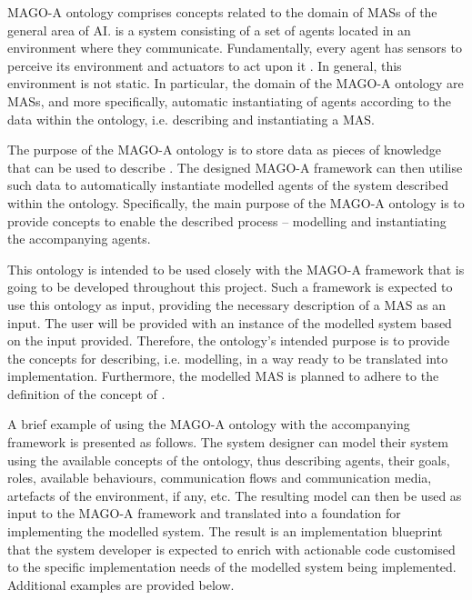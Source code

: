 MAGO-A ontology
%
comprises concepts related to the domain of \acp{MAS} of the general area of \ac{AI}.  is a system consisting of a set of agents located in an environment where they communicate. Fundamentally, every agent has sensors to perceive its environment and actuators to act upon it \cite[p. 54]{russell2022ArtificialIntelligenceModern}. In general, this environment is not static. In particular, the domain of the MAGO-A ontology are \acp{MAS}, and more specifically, automatic instantiating of agents according to the data within the ontology, i.e. describing and instantiating a \ac{MAS}.

The purpose
%
of the MAGO-A ontology is to store data as pieces of knowledge that can be used to describe . The designed MAGO-A framework can then utilise such data to automatically instantiate modelled agents of the system described within the ontology. Specifically, the main purpose of the MAGO-A ontology is to provide concepts to enable the described process -- modelling  and instantiating the accompanying agents.

This ontology is intended to be used
%
closely with the MAGO-A framework that is going to be developed throughout this project. Such a framework is expected to use this ontology as input, providing the necessary description of a \ac{MAS} as an input. The user will be provided with an instance of the modelled system based on the input provided. Therefore, the ontology's intended purpose is to provide the concepts for describing, i.e. modelling,  in a way ready to be translated into implementation. Furthermore, the modelled \ac{MAS} is planned to adhere to the definition of the concept of .

A brief example of using
%
the MAGO-A ontology with the accompanying framework is presented as follows. The system designer can model their system using the available concepts of the ontology, thus describing agents, their goals, roles, available behaviours, communication flows and communication media, artefacts of the environment, if any, etc. The resulting model can then be used as input to the MAGO-A framework and translated into a foundation for implementing the modelled system. The result is an implementation blueprint that the system developer is expected to enrich with actionable code customised to the specific implementation needs of the modelled system being implemented. Additional examples are provided below.%

